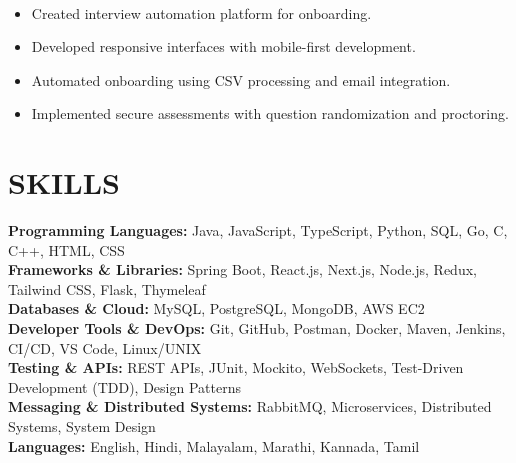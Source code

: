 \documentclass[10pt,a4paper]{article}
\begin{document}
\noindent
{}\\[-12pt]

\begin{itemize}

\item Created interview automation platform for onboarding.

\item Developed responsive interfaces with mobile-first development.

\item Automated onboarding using CSV processing and email integration.

\item Implemented secure assessments with question randomization and proctoring.

\end{itemize}
\section*{SKILLS}

\small

\textbf{Programming Languages:}
Java, JavaScript, TypeScript, Python, SQL, Go, C, C++, HTML, CSS
\\[2pt]
\textbf{Frameworks \& Libraries:}
Spring Boot, React.js, Next.js, Node.js, Redux, Tailwind CSS, Flask, Thymeleaf
\\[2pt]
\textbf{Databases \& Cloud:}
MySQL, PostgreSQL, MongoDB, AWS EC2
\\[2pt]
\textbf{Developer Tools \& DevOps:}
Git, GitHub, Postman, Docker, Maven, Jenkins, CI/CD, VS Code, Linux/UNIX
\\[2pt]
\textbf{Testing \& APIs:}
REST APIs, JUnit, Mockito, WebSockets, Test-Driven Development (TDD), Design Patterns
\\[2pt]
\textbf{Messaging \& Distributed Systems:}
RabbitMQ, Microservices, Distributed Systems, System Design
\\[2pt]
\textbf{Languages:}
English, Hindi, Malayalam, Marathi, Kannada, Tamil

\end{document}
